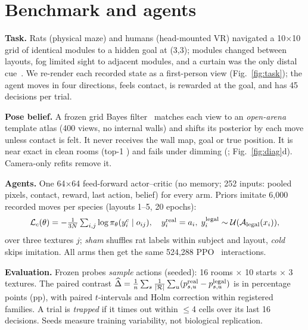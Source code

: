 \documentclass[10pt,twocolumn,letterpaper]{article}
\begin{document}
\section{Benchmark and agents}
\textbf{Task.} Rats (physical maze) and humans (head-mounted VR) navigated a 10$\times$10 grid of identical modules
to a hidden goal at (3,3); modules changed between layouts, fog limited sight to adjacent modules, and a curtain was
the only distal cue~\cite{decothi2022}. We re-render each recorded state as a first-person view (Fig.~\ref{fig:task});
the agent moves in four directions, feels contact, is rewarded at the goal, and has 45 decisions per trial.

\textbf{Pose belief.}\label{sec:belief} A frozen grid Bayes filter~\cite{fox1999} matches each view to an
\emph{open-arena} template atlas (400 views, no internal walls) and shifts its posterior by each move unless contact
is felt. It never receives the wall map, goal or true position. It is near exact in clean rooms (top-1 \Bclean) and
fails under dimming (\Bdim; Fig.~\ref{fig:diag}d). Camera-only refits remove it.

\textbf{Agents.} One 64$\times$64 feed-forward actor--critic (no memory; 252 inputs: pooled pixels, contact,
reward, last action, belief) for every arm. Priors imitate 6,000 recorded moves per species (layouts 1--5, 20 epochs):
\begin{equation}
\mathcal L_c(\theta)=-\tfrac{1}{3N}\textstyle\sum_{i,j}\log\pi_\theta(y_i^c\mid o_{ij}),\quad
y_i^{\rm real}=a_i,\; y_i^{\rm legal}\sim\mathcal U(\mathcal A_{\rm legal}(x_i)),
\label{eq:bc}
\end{equation}
over three textures $j$; \emph{sham} shuffles rat labels within subject and layout, \emph{cold} skips imitation.
All arms then get the same 524,288 PPO~\cite{schulman2017ppo} interactions.

\textbf{Evaluation.} Frozen probes \emph{sample} actions (seeded): 16 rooms $\times$ 10 starts $\times$ 3 textures.
The paired contrast $\widehat\Delta=\frac1n\sum_s\frac{1}{|\mathcal R|}\sum_u(p^{\rm real}_{s,u}-p^{\rm legal}_{s,u})$
is in percentage points (pp), with paired $t$-intervals and Holm correction within registered families. A trial is
\emph{trapped} if it times out within $\leq$4 cells over its last 16 decisions. Seeds measure training variability,
not biological replication.
\end{document}
